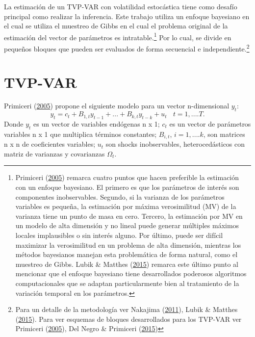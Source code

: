 \documentclass[12pt,oneside]{reedthesis}
\begin{document}
La estimación de un TVP-VAR con volatilidad estocástica tiene como desafío principal como realizar la inferencia. Este trabajo utiliza un enfoque bayesiano en el cual se utiliza el muestreo de Gibbs en el cual el problema original de la estimación del vector de parámetros es intratable.\footnote{Primiceri (\protect\hyperlink{ref-Primiceri2005}{2005}) remarca cuatro puntos que hacen preferible la estimación con un enfoque bayesiano. El primero es que los parámetros de interés son componentes inobservables. Segundo, si la varianza de los parámetros variables es pequeña, la estimación por máxima verosimilitud (MV) de la varianza tiene un punto de masa en cero. Tercero, la estimación por MV en un modelo de alta dimensión y no lineal puede generar múltiples máximos locales implausibles o sin interés alguno. Por último, puede ser difícil maximizar la verosimilitud en un problema de alta dimensión, mientras los métodos bayesianos manejan esta problemática de forma natural, como el muestreo de Gibbs. Lubik \& Matthes (\protect\hyperlink{ref-Lubik2016b}{2015}) remarca este último punto al mencionar que el enfoque bayesiano tiene desarrollados poderosos algoritmos computacionales que se adaptan particularmente bien al tratamiento de la variación temporal en los parámetros.} Por lo cual, se divide en pequeños bloques que pueden ser evaluados de forma secuencial e independiente.\footnote{Para un detalle de la metodología ver Nakajima (\protect\hyperlink{ref-Nakajima2011}{2011}), Lubik \& Matthes (\protect\hyperlink{ref-Lubik2016b}{2015}). Para ver esquemas de bloques desarrollados para los TVP-VAR ver Primiceri (\protect\hyperlink{ref-Primiceri2005}{2005}), Del Negro \& Primiceri (\protect\hyperlink{ref-DelNegro2015}{2015})}

\hypertarget{tvp-var}{%
\section{TVP-VAR}\label{tvp-var}}

Primiceri (\protect\hyperlink{ref-Primiceri2005}{2005}) propone el siguiente modelo para un vector n-dimensional \(y_t\):
\begin{equation}
y_t = c_t + B_{1,t}y_{t-1} + ...+ B_{k,t}y_{t-k} + u_t \ \ \ \ t = 1,....T.
\label{eq:var-reducido}
\end{equation}
Donde \(y_t\) es un vector de variables endógenas n x 1; \(c_t\) es un vector de parámetros variables n x 1 que multiplica términos constantes; \(B_{i,t}\), \(i = 1,....k\), son matrices n x n de coeficientes variables; \(u_t\) son shocks inobservables, heterocedásticos con matriz de varianzas y covarianzas \(\Omega_t\).
\end{document}

